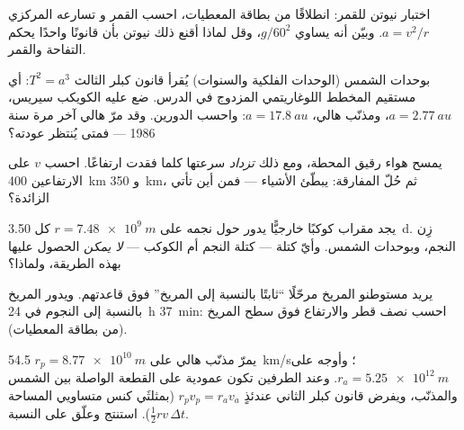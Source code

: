 \begin{exercise}[$\star\star$]\label{exo:g12:satellites-kepler:10}
اختبار نيوتن للقمر: انطلاقًا من بطاقة المعطيات، احسب  القمر و
تسارعه المركزي $a = v^2/r$. وبيّن أنه يساوي $g/60^2$،
وقل لماذا أقنع ذلك نيوتن بأن قانونًا واحدًا يحكم التفاحة والقمر.
\end{exercise}

\begin{exercise}[$\star\star$]\label{exo:g12:satellites-kepler:11}
بوحدات الشمس (الوحدات الفلكية والسنوات) يُقرأ قانون كبلر الثالث
$T^2 = a^3$: أي مستقيم المخطط اللوغاريتمي المزدوج في الدرس. ضع
عليه الكويكب سيريس، $a = \qty{2.77}{au}$، ومذنّب هالي،
$a = \qty{17.8}{au}$: واحسب الدورين. وقد مرّ هالي 
آخر مرة سنة 1986 --- فمتى يُنتظر عودته؟
\end{exercise}

\begin{exercise}[$\star\star\star$]\label{exo:g12:satellites-kepler:12}
يمسح هواء رقيق المحطة، ومع ذلك \emph{تزداد} سرعتها كلما
فقدت ارتفاعًا. احسب $v$ على الارتفاعين \qty{400}{km} و
\qty{350}{km}، ثم حُلّ المفارقة:  يبطّئ الأشياء
--- فمن أين تأتي  الزائدة؟
\end{exercise}

\begin{exercise}[$\star\star\star$]\label{exo:g12:satellites-kepler:13}
يجد مقراب كوكبًا خارجيًّا يدور حول نجمه على
$r = \qty{7.48e9}{m}$ كل \qty{3.50}{d}. زِن النجم،
 وبوحدات الشمس. وأيّ كتلة --- كتلة النجم أم الكوكب ---
\emph{لا يمكن} الحصول عليها بهذه الطريقة، ولماذا؟
\end{exercise}

\begin{exercise}[$\star\star\star$]\label{exo:g12:satellites-kepler:14}
يريد مستوطنو المريخ مرحّلًا ``ثابتًا بالنسبة إلى المريخ'' فوق قاعدتهم.
ويدور المريخ بالنسبة إلى النجوم في \qty{24}{h} \qty{37}{min}:
احسب نصف قطر  والارتفاع فوق سطح
المريخ (من بطاقة المعطيات).
\end{exercise}

\begin{exercise}[$\star\star\star$]\label{exo:g12:satellites-kepler:15}
يمرّ مذنّب هالي  على $r_p = \qty{8.77e10}{m}$ 
\qty{54.5}{km/s}؛ وأوجه على $r_a = \qty{5.25e12}{m}$. وعند
الطرفين تكون  عمودية على القطعة الواصلة بين الشمس والمذنّب،
ويفرض قانون كبلر الثاني عندئذٍ $r_p v_p = r_a v_a$
(بمثلثَي كنس متساويي المساحة $\tfrac12 r v\,\Delta t$). استنتج
  وعلّق على النسبة.
\end{exercise}

